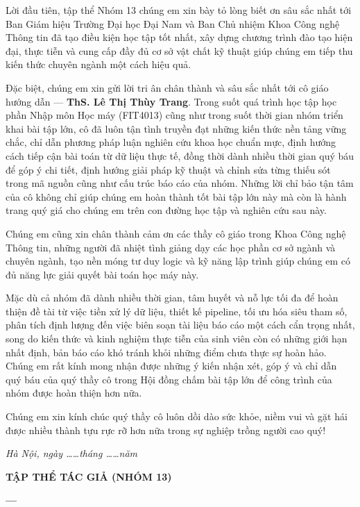 
Lời đầu tiên, tập thể Nhóm 13 chúng em xin bày tỏ lòng biết ơn sâu sắc nhất tới Ban Giám hiệu Trường Đại học Đại Nam và Ban Chủ nhiệm Khoa Công nghệ Thông tin đã tạo điều kiện học tập tốt nhất, xây dựng chương trình đào tạo hiện đại, thực tiễn và cung cấp đầy đủ cơ sở vật chất kỹ thuật giúp chúng em tiếp thu kiến thức chuyên ngành một cách hiệu quả.

Đặc biệt, chúng em xin gửi lời tri ân chân thành và sâu sắc nhất tới cô giáo hướng dẫn --- \textbf{ThS. Lê Thị Thùy Trang}. Trong suốt quá trình học tập học phần Nhập môn Học máy (FIT4013) cũng như trong suốt thời gian nhóm triển khai bài tập lớn, cô đã luôn tận tình truyền đạt những kiến thức nền tảng vững chắc, chỉ dẫn phương pháp luận nghiên cứu khoa học chuẩn mực, định hướng cách tiếp cận bài toán từ dữ liệu thực tế, đồng thời dành nhiều thời gian quý báu để góp ý chi tiết, định hướng giải pháp kỹ thuật và chỉnh sửa từng thiếu sót trong mã nguồn cũng như cấu trúc báo cáo của nhóm. Những lời chỉ bảo tận tâm của cô không chỉ giúp chúng em hoàn thành tốt bài tập lớn này mà còn là hành trang quý giá cho chúng em trên con đường học tập và nghiên cứu sau này.

Chúng em cũng xin chân thành cảm ơn các thầy cô giáo trong Khoa Công nghệ Thông tin, những người đã nhiệt tình giảng dạy các học phần cơ sở ngành và chuyên ngành, tạo nền móng tư duy logic và kỹ năng lập trình giúp chúng em có đủ năng lực giải quyết bài toán học máy này.

Mặc dù cả nhóm đã dành nhiều thời gian, tâm huyết và nỗ lực tối đa để hoàn thiện đề tài từ việc tiền xử lý dữ liệu, thiết kế pipeline, tối ưu hóa siêu tham số, phân tích định lượng đến việc biên soạn tài liệu báo cáo một cách cẩn trọng nhất, song do kiến thức và kinh nghiệm thực tiễn của sinh viên còn có những giới hạn nhất định, bản báo cáo khó tránh khỏi những điểm chưa thực sự hoàn hảo. Chúng em rất kính mong nhận được những ý kiến nhận xét, góp ý và chỉ dẫn quý báu của quý thầy cô trong Hội đồng chấm bài tập lớn để công trình của nhóm được hoàn thiện hơn nữa.

Chúng em xin kính chúc quý thầy cô luôn dồi dào sức khỏe, niềm vui và gặt hái được nhiều thành tựu rực rỡ hơn nữa trong sự nghiệp trồng người cao quý!

\vspace{1cm}

\begin{flushright}
\begin{minipage}{9cm}
\centering
\textit{Hà Nội, ngày \ldots\ldots tháng \ldots\ldots năm \Nam}

\vspace{0.4cm}

\textbf{TẬP THỂ TÁC GIẢ (NHÓM 13)}

\vspace{2.2cm}

\textbf{\TenSinhVienMot \quad --- \quad \TenSinhVienHai}
\end{minipage}
\end{flushright}